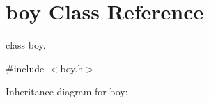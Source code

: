 \hypertarget{classboy}{}\section{boy Class Reference}
\label{classboy}


class boy.  




{\ttfamily \#include $<$boy.\+h$>$}



Inheritance diagram for boy\+:
